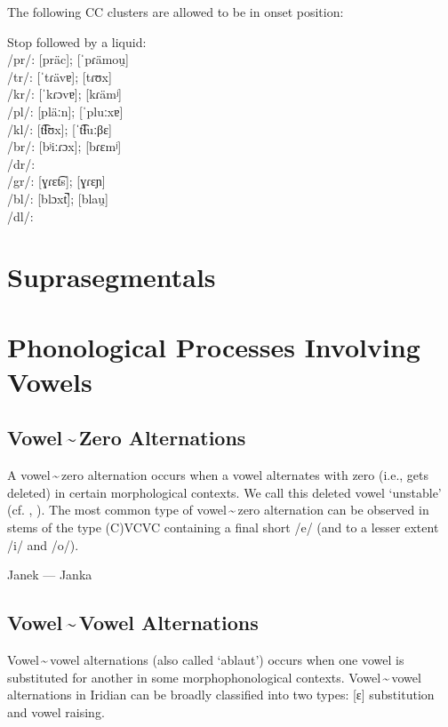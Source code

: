 \par The following CC clusters are allowed to be in onset position:

\pex
\a Stop followed by a liquid:\\
/pr/:  [pr\"ac];  [ˈpɾämou̯]\\
/tr/:  [ˈtɾävɐ];  [tɾʊx]\\
/kr/:  [ˈkɾɔvɐ];  [kɾämʲ]\\
/pl/:  [pläːn];  [ˈpluːxɐ]\\
/kl/:  [t͡ɬʊx];  [ˈt͡ɬuːβɛ]\\
/br/:  [bʲiːɾɔx];  [bɾɛmʲ]\\
/dr/: \\
/gr/:  [ɣɾɛt͡s];  [ɣɾɛɲ]\\
/bl/:  [blɔxt̚];  [blau̯]\\
/dl/:
\xe

\section{Suprasegmentals}


\section{Phonological Processes Involving Vowels}

\subsection{Vowel\,\sim\,Zero Alternations}

A vowel\,\sim\,zero alternation occurs when a vowel alternates with zero (i.e., gets deleted) in certain morphological contexts. We call this deleted vowel `unstable' (cf. \cite{siptar2000}, \cite{gussmann2007}). The most common type of vowel\,\sim\,zero alternation can be observed in stems of the type (C)VCVC containing a final short /e/ (and to a lesser extent /i/ and /o/).

\ex
Janek --- Janka
\xe

\subsection{Vowel\,\sim\,Vowel Alternations}
Vowel\,\sim\,vowel alternations (also called `ablaut') occurs when one vowel is substituted for another in some morphophonological contexts. Vowel\,\sim\,vowel alternations in Iridian can be broadly classified into two types: [ɛ] substitution and vowel raising.

